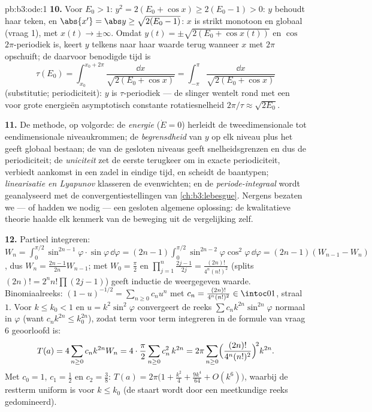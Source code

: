 \begin{solution}{pb:b3:ode:1}
\textbf{10.} Voor $E_0 > 1$: $y^2 = 2(E_0 + \cos x) \geq 2(E_0 -
1) > 0$: $y$ behoudt haar teken, en $\abs{x'} = \abs y \geq
\sqrt{2(E_0 - 1)}$: $x$ is strikt monotoon en globaal (vraag 1),
met $x(t) \to \pm\infty$. Omdat $y(t) = \pm\sqrt{2(E_0 + \cos
x(t))}$ en $\cos$ $2\pi$-periodiek is, keert $y$ telkens naar
haar waarde terug wanneer $x$ met $2\pi$ opschuift; de daarvoor
benodigde tijd is
\[
\tau(E_0) = \int_{x_0}^{x_0 + 2\pi}\frac{\dd
x}{\sqrt{2(E_0 + \cos x)}} =
\int_{-\pi}^{\pi}\frac{\dd x}{\sqrt{2(E_0 + \cos x)}}
\]
(substitutie; periodiciteit): $y$ is $\tau$-periodiek --- de
slinger wentelt rond met een voor grote energieën asymptotisch
constante rotatiesnelheid $2\pi/\tau \approx \sqrt{2E_0}$.

\textbf{11.} De methode, op volgorde: de \emph{energie} ($\dot E
= 0$) herleidt de tweedimensionale  tot eendimensionale
niveaukrommen; de \emph{begrensdheid} van $y$ op elk niveau plus
het  geeft globaal bestaan;
de \emph{} van de gesloten niveaus geeft
snelheidsgrenzen en dus de periodiciteit; de \emph{uniciteit}
zet de eerste terugkeer om in exacte periodiciteit, verbiedt
aankomst in een zadel in eindige tijd, en scheidt de baantypen;
\emph{linearisatie en Lyapunov} klasseren de evenwichten; en de
\emph{periode-integraal} wordt geanalyseerd met de
convergentiestellingen van \cref{ch:b3:lebesgue}. Nergens
bezaten we --- of hadden we nodig --- een gesloten algemene
oplossing: de kwalitatieve theorie haalde elk kenmerk van de
beweging uit de vergelijking zelf.

\textbf{12.} Partieel integreren: $W_n =
\int_0^{\pi/2}\sin^{2n-1}\varphi \cdot\sin\varphi\,\dd\varphi =
(2n-1)\int_0^{\pi/2} \sin^{2n-2}\varphi\cos^2\varphi\,\dd\varphi
= (2n-1)(W_{n-1} - W_n)$, dus $W_n = \frac{2n-1}{2n}W_{n-1}$; met
$W_0 = \frac\pi2$ en $\prod_{j=1}^n\frac{2j-1}{2j} =
\frac{(2n)!}{4^n(n!)^2}$ (splits $(2n)! = 2^nn!\prod(2j-1)$)
geeft inductie de weergegeven waarde. Binomiaalreeks: $(1 -
u)^{-1/2} = \sum_{n\geq0}c_nu^n$ met $c_n =
\frac{(2n)!}{4^n(n!)^2} \in \intoc01$, straal $1$. Voor $k \leq
k_0 < 1$ en $u = k^2\sin^2\varphi$ convergeert de reeks $\sum
c_nk^{2n}\sin^{2n}\varphi$ normaal in $\varphi$ (want $c_nk^{2n}
\leq k_0^{2n}$), zodat term voor term integreren in de formule
van vraag 6 geoorloofd is:
\[
T(a) = 4\sum_{n\geq0}c_nk^{2n}W_n
= 4\cdot\frac\pi2\sum_{n\geq0}c_n^2\,k^{2n}
= 2\pi\sum_{n\geq0}
\Bigl(\frac{(2n)!}{4^n(n!)^2}\Bigr)^{\!2}k^{2n} .
\]
Met $c_0 = 1$, $c_1 = \frac12$ en $c_2 = \frac38$: $T(a) =
2\pi\bigl(1 + \frac{k^2}4 + \frac{9k^4}{64} + O(k^6)\bigr)$,
waarbij de restterm uniform is voor $k \leq k_0$ (de staart wordt
door een meetkundige reeks gedomineerd).


\end{solution}
